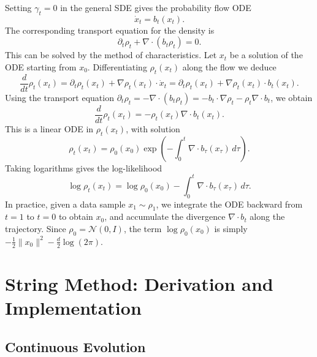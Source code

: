 \documentclass{article}
\theoremstyle{plain}
\theoremstyle{definition}
\theoremstyle{remark}
\begin{document}
Setting $\gamma_t = 0$ in the general SDE gives the probability flow ODE
\begin{equation}
    \dot{x}_t = b_t(x_t).
\end{equation}
The corresponding transport equation for the density is
\begin{equation}
    \partial_t \rho_t + \nabla \cdot (b_t \rho_t) = 0.
\end{equation}
This can be solved by the method of characteristics. Let $x_t$ be a solution of the ODE starting from $x_0$. Differentiating $\rho_t(x_t)$ along the flow we deduce
\begin{equation}
    \frac{d}{dt} \rho_t(x_t) = \partial_t \rho_t(x_t) + \nabla \rho_t(x_t) \cdot \dot{x}_t = \partial_t \rho_t(x_t) + \nabla \rho_t(x_t) \cdot b_t(x_t).
\end{equation}
Using the transport equation $\partial_t \rho_t = -\nabla \cdot (b_t \rho_t) = -b_t \cdot \nabla \rho_t - \rho_t \nabla \cdot b_t$, we obtain
\begin{equation}
    \frac{d}{dt} \rho_t(x_t) = -\rho_t(x_t) \nabla \cdot b_t(x_t).
\end{equation}
This is a linear ODE in $\rho_t(x_t)$, with solution
\begin{equation}
    \rho_t(x_t) = \rho_0(x_0) \exp\left( -\int_0^t \nabla \cdot b_\tau(x_\tau) \, d\tau \right).
\end{equation}
Taking logarithms gives the log-likelihood
\begin{equation}
    \log \rho_t(x_t) = \log \rho_0(x_0) - \int_0^t \nabla \cdot b_\tau(x_\tau) \, d\tau.
    \label{eq:log_likelihood}
\end{equation}
In practice, given a data sample $x_1 \sim \rho_1$, we integrate the ODE backward from $t=1$ to $t=0$ to obtain $x_0$, and accumulate the divergence $\nabla \cdot b_t$ along the trajectory. Since $\rho_0 = \mathcal{N}(0, I)$, the term $\log \rho_0(x_0)$ is simply $-\frac{1}{2}\|x_0\|^2 - \frac{d}{2}\log(2\pi)$.



\section{String Method: Derivation and Implementation}
\label{app:string}

\subsection{Continuous Evolution}
\end{document}
